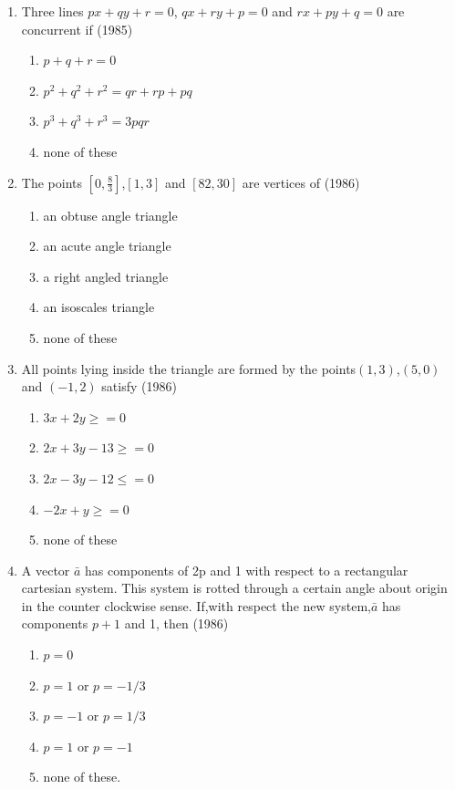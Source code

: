 \documentclass[12pt]{article}
\providecommand{\brak}[1]{\ensuremath{\left(#1\right)}}
\providecommand{\sbrak}[1]{\ensuremath{{}\left[#1\right]}}
\begin{document}
\begin{enumerate}
\item Three lines $px+qy+r=0$, $qx+ry+p=0$ and $rx+py+q=0$ are concurrent if  (1985)\\
\begin{enumerate}
\item $p+q+r=0$
\item $p^2+q^2+r^2=qr+rp+pq$
\item $p^3+q^3+r^3=3pqr$
\item none of these
\end{enumerate}
\item The points $\sbrak{0,\frac{8}{3}}$,$\sbrak{1,3}$ and $\sbrak{82,30}$ are vertices of (1986)\\
\begin{enumerate}
\item an obtuse angle triangle
\item an acute angle triangle 
\item a  right angled triangle
\item an isoscales triangle
\item none of these
\end{enumerate}
\item All points lying inside the triangle are formed by the points$\brak{1,3}$,$(5,0)$ and $(-1,2)$ satisfy (1986)\\
\begin{enumerate}
\item $3x+2y\ge=0$
\item $2x+3y-13\ge=0$
\item $2x-3y-12\le=0$
\item $-2x+y\ge=0$
\item none of these
\end{enumerate}
\item A vector $\bar{a}$ has components of 2p and 1 with respect to a rectangular cartesian system. This system is rotted through a certain angle about origin in the counter clockwise sense. If,with respect the new system,$\bar{a}$ has components $p+1$ and 1, then (1986)\\
\begin{enumerate}
\item $p=0$  
\item $p=1$ or  $p=-1/3$  
\item $p=-1$ or $p=1/3$ 
\item $p=1$ or  $p=-1$
\item none of these.
\end{enumerate}

\end{enumerate}
\end{document}

